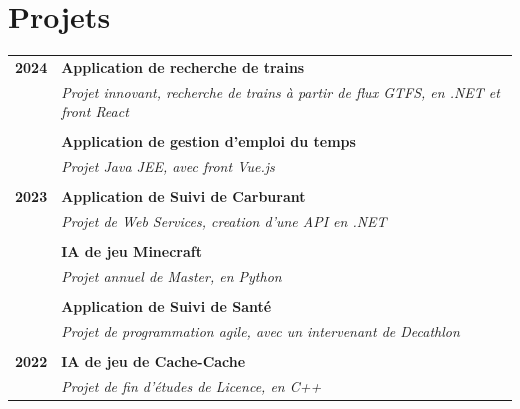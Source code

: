 \documentclass[a4paper, 12pt]{article}
\begin{document}
\begin{minipage}[t]{0.65\textwidth}
	\section*{\textcolor{sectioncolor}{Projets}}
	\begin{tabular}{ m{} m{} }
		\textbf{2024} & \textbf{Application de recherche de trains}                                                 \\
		              & \textit{Projet innovant, recherche de trains à partir de flux GTFS, en .NET et front React} \\
		              &                                                                                             \\
		              & \textbf{Application de gestion d'emploi du temps}                                           \\
		              & \textit{Projet Java JEE, avec front Vue.js}                                                 \\
		              &                                                                                             \\
		\textbf{2023} & \textbf{Application de Suivi de Carburant}                                                  \\
		              & \textit{Projet de Web Services, creation d'une API en .NET}                                 \\
		              &                                                                                             \\
		              & \textbf{IA de jeu Minecraft}                                                                \\
		              & \textit{Projet annuel de Master, en Python}                                                 \\
		              &                                                                                             \\
		              & \textbf{Application de Suivi de Santé}                                                      \\
		              & \textit{Projet de programmation agile, avec un intervenant de Decathlon}                    \\
		              &                                                                                             \\
		\textbf{2022} & \textbf{IA de jeu de Cache-Cache}                                                           \\
		              & \textit{Projet de fin d'études de Licence, en C++}                                          \\
	\end{tabular}


\end{minipage}
\end{document}

